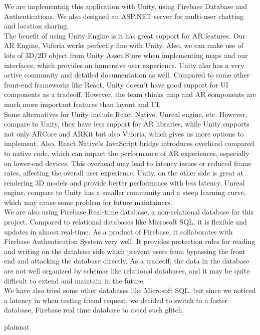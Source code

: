 \documentclass[12pt, titlepage]{article}
\begin{document}
\begin{enumerate}
  We are implementing this application with Unity, using Firebase Database and Authentications. We also designed an ASP.NET server for multi-user chatting and location sharing.\\
  The benefit of using Unity Engine is it has great support for AR features. Our AR Engine, Vuforia works perfectly fine with Unity.  Also, we can make use of lots of 3D/2D object from Unity Asset Store when implementing maps and our interfaces, which provides an immersive user experience.  Unity also has a very active community and detailed documentation as well.  Compared to some other front-end frameworks like React, Unity doesn't have good support for UI components as a tradeoff. However, the team thinks map and AR components are much more important features than layout and UI.\\
    Some alternatives for Unity include React Native, Unreal engine, etc. However, compare to Unity, they have less support for AR libraries, while Unity supports not only ARCore and ARKit but also Vuforia, which gives us more options to implement. Also, React Native's JavaScript bridge introduces overhead compared to native code, which can impact the performance of AR experiences, especially on lower-end devices. This overhead may lead to latency issues or reduced frame rates, affecting the overall user experience. Unity, on the other side is great at rendering 3D models and provide better performance with less latency. Unreal engine, compare to Unity has a smaller community and a steep learning curve, which may cause some problem for future maintainers.\\
  	We are also using Firebase Real-time database, a non-relational database for this project. Compared to relational databases like Microsoft SQL,  it is flexible and updates in almost real-time. As a product of Firebase, it collaborates with Firebase Authentication System very well. It provides protection rules for reading and writing on the database side which prevent users from bypassing the front end and attacking the database directly. As a tradeoff, the data in the database are not well organized by schemas like relational databases, and it may be quite difficult to extend and maintain in the future.\\
  	We have also tried some other databases like Microsoft SQL, but since we noticed a latency in when testing friend request, we decided to switch to a faster database, Firebase real time database to avoid such glitch.
\end{enumerate}

\newpage
 {plainnat}


\newpage{}
\end{document}
